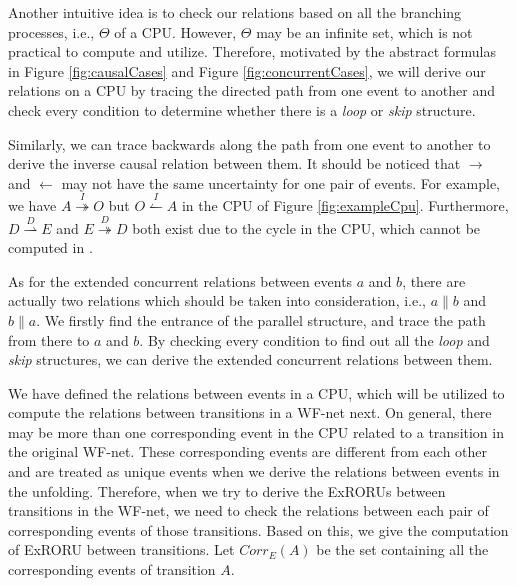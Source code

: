 \documentclass{llncs}
\begin{document}
Another intuitive idea is to check our relations based on all the branching processes, i.e., $\Theta$ of a CPU. However, $\Theta$ may be an infinite set, which is not practical to compute and utilize. Therefore, motivated by the abstract formulas in Figure \ref{fig:causalCases} and Figure \ref{fig:concurrentCases}, we will derive our relations on a CPU by tracing the directed path from one event to another and check every condition to determine whether there is a \textit{loop} or \textit{skip} structure.

Similarly, we can trace backwards along the path from one event to another to derive the inverse causal relation between them. It should be noticed that $\rightarrow$ and $\leftarrow$ may not have the same uncertainty for one pair of events. For example, we have $A\overset{I}{\twoheadrightarrow}O$ but $O\overset{I}{\leftharpoonup}A$ in the CPU of Figure \ref{fig:exampleCpu}. Furthermore, $D\overset{D}{\rightharpoonup}E$ and $E\overset{D}{\twoheadrightarrow}D$ both exist due to the cycle in the CPU, which cannot be computed in \cite{jin2014computing}.

As for the extended concurrent relations between events $a$ and $b$, there are actually two relations which should be taken into consideration, i.e., $a\parallel b$ and $b\parallel a$. We firstly find the entrance of the parallel structure, and trace the path from there to $a$ and $b$. By checking every condition to find out all the \textit{loop} and \textit{skip} structures, we can derive the extended concurrent relations between them.

We have defined the relations between events in a CPU, which will be utilized to compute the relations between transitions in a WF-net next. On general, there may be more than one corresponding event in the CPU related to a transition in the original WF-net. These corresponding events are different from each other and are treated as unique events when we derive the relations between events in the unfolding. Therefore, when we try to derive the ExRORUs between transitions in the WF-net, we need to check the relations between each pair of corresponding events of those transitions. Based on this, we give the computation of ExRORU between transitions. Let $Corr_{E}(A)$ be the set containing all the corresponding events of transition $A$.
\end{document}
